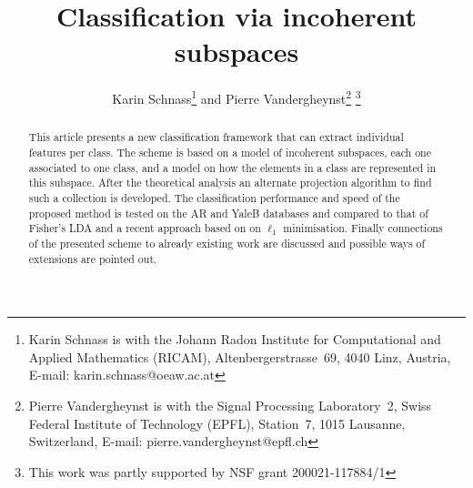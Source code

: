 \documentclass[11pt]{article}
\title{Classification via incoherent subspaces}
\author{Karin Schnass\thanks{Karin Schnass is with the Johann Radon Institute for Computational and Applied Mathematics (RICAM), Altenbergerstrasse~69, 4040 Linz, Austria,
	E-mail: karin.schnass@oeaw.ac.at }  and Pierre Vandergheynst\thanks{Pierre Vandergheynst is with the Signal Processing Laboratory~2,
Swiss Federal Institute of Technology (EPFL), Station~7, 1015 Lausanne, Switzerland,
E-mail: pierre.vandergheynst@epfl.ch}
\thanks{This work was partly supported by NSF grant 200021-117884/1}
}
\begin{document}
\date{}

\maketitle
\thispagestyle{empty}

\begin{abstract}
This article presents a new classification framework that can extract individual features per class. The scheme is based on a model of incoherent subspaces, each one associated to one class, and a model on how the elements in a class are represented in this subspace. After the theoretical analysis an alternate projection algorithm to find such a collection is developed. The classification performance and speed of the proposed method is tested on the AR and YaleB databases and compared to that of Fisher's LDA and a recent approach based on on $\ell_1$ minimisation. Finally connections of the presented scheme to already existing work are discussed and possible ways of extensions are pointed out.\\
\end{abstract}


\end{document}
